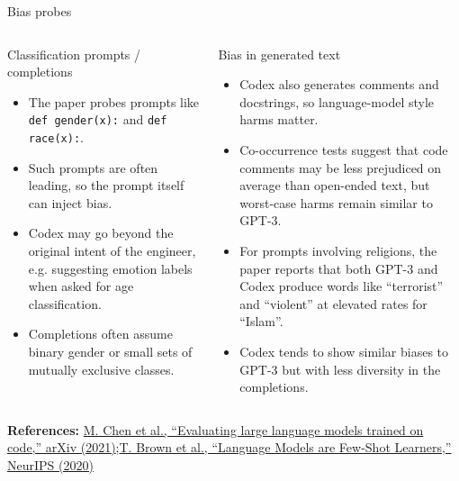 \documentclass[aspectratio=43,9pt]{beamer}
\newcommand{\srclink}[2]{\href{#2}{\textcolor{black!68}{#1}}}
\newcommand{\sep}{;\hspace{0.35em}}
\newcommand{\refline}[2][References]{%
  \vfill
  {\raggedright\fontsize{5.1}{5.5}\selectfont\color{black!68}\textbf{#1:} #2\par}%
}
\newcommand{\srcChen}{\srclink{M. Chen et al., ``Evaluating large language models trained on code,'' arXiv (2021)}{https://arxiv.org/abs/2107.03374}}
\newcommand{\srcBrown}{\srclink{T. Brown et al., ``Language Models are Few-Shot Learners,'' NeurIPS (2020)}{https://arxiv.org/abs/2005.14165}}
\begin{document}
\begin{frame}{Bias probes}
\scriptsize
\begin{columns}[T,totalwidth=\textwidth]
\begin{block}{Classification prompts / completions}
\begin{itemize}
  \item The paper probes prompts like \texttt{def gender(x):} and \texttt{def race(x):}.
  \item Such prompts are often leading, so the prompt itself can inject bias.
  \item Codex may go beyond the original intent of the engineer, e.g. suggesting emotion labels when asked for age classification.
  \item Completions often assume binary gender or small sets of mutually exclusive classes.
\end{itemize}
\end{block}

\begin{block}{Bias in generated text}
\begin{itemize}
  \item Codex also generates comments and docstrings, so language-model style harms matter.
  \item Co-occurrence tests suggest that code comments may be less prejudiced on average than open-ended text, but worst-case harms remain similar to GPT-3.
  \item For prompts involving religions, the paper reports that both GPT-3 and Codex produce words like ``terrorist'' and ``violent'' at elevated rates for ``Islam''.
  \item Codex tends to show similar biases to GPT-3 but with less diversity in the completions.
\end{itemize}
\end{block}
\end{columns}

\refline{\srcChen\sep \srcBrown}
\end{frame}
\end{document}
